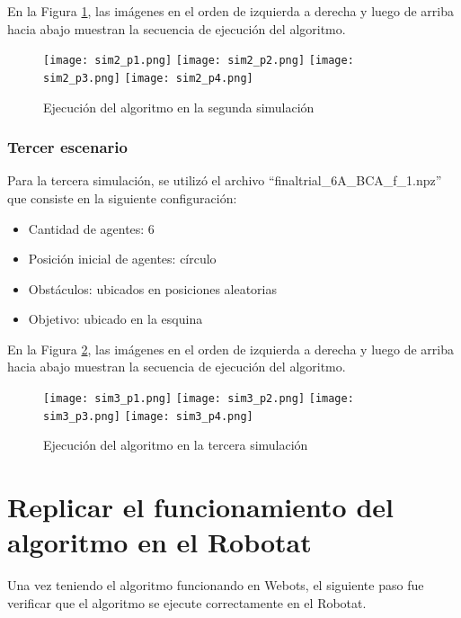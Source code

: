 En la Figura \ref{fig:segunda_simulacion}, las imágenes en el orden de izquierda a derecha y luego de arriba hacia abajo muestran la secuencia de ejecución del algoritmo.

\begin{figure}[H]
	\centering
	\texttt{[image: sim2\_p1.png]}
	\texttt{[image: sim2\_p2.png]}
	\texttt{[image: sim2\_p3.png]}
	\texttt{[image: sim2\_p4.png]}
	\caption{Ejecución del algoritmo en la segunda simulación}
	\label{fig:segunda_simulacion}
\end{figure}

\subsubsection{Tercer escenario}
Para la tercera simulación, se utilizó el archivo ``finaltrial\_6A\_BCA\_f\_1.npz'' que consiste en la siguiente configuración:
\begin{itemize}
	\item Cantidad de agentes: 6
	\item Posición inicial de agentes: círculo
	\item Obstáculos: ubicados en posiciones aleatorias
	\item Objetivo: ubicado en la esquina
\end{itemize}

En la Figura \ref{fig:tercera_simulacion}, las imágenes en el orden de izquierda a derecha y luego de arriba hacia abajo muestran la secuencia de ejecución del algoritmo.

\begin{figure}[H]
	\centering
	\texttt{[image: sim3\_p1.png]}
	\texttt{[image: sim3\_p2.png]}
	\texttt{[image: sim3\_p3.png]}
	\texttt{[image: sim3\_p4.png]}
	\caption{Ejecución del algoritmo en la tercera simulación}
	\label{fig:tercera_simulacion}
\end{figure}



\section{Replicar el funcionamiento del algoritmo en el Robotat}
Una vez teniendo el algoritmo funcionando en Webots, el siguiente paso fue verificar que el algoritmo se ejecute correctamente en el Robotat.

